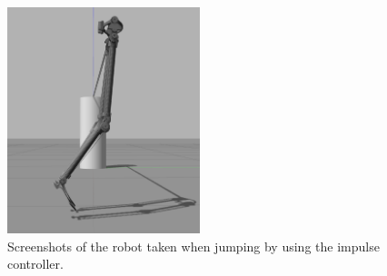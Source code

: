 \begin{figure}[ht!]
     \centering
    \includegraphics[width=0.5\textwidth]{figures/gazebo_jumping}
    \caption{Screenshots of the robot taken when jumping by using the impulse controller.}
     \label{fig:gazebo_jumping}
\end{figure}  


